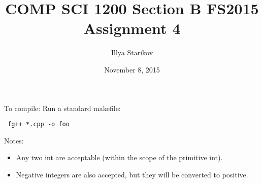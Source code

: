 \documentclass{article}
\begin{document}
\title{COMP SCI 1200 Section B FS2015 Assignment 4}
\date{November 8, 2015}
\author{Illya Starikov}

\maketitle

\noindent
To compile: Run a standard makefile: \begin{verbatim} fg++ *.cpp -o foo \end{verbatim}

\noindent
Notes:
\begin{itemize}
\item Any two int are acceptable (within the scope of the primitive int).
\item Negative integers are also accepted, but they will be converted to positive.
\end{itemize}
\end{document}

